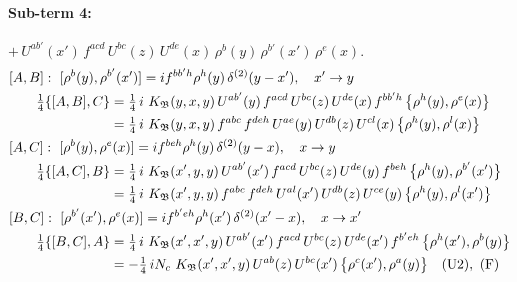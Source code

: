 \documentclass[10pt]{article}
\numberwithin{equation}{section}
\begin{document}
\paragraph{Sub-term 4:} $+\,U^{ab'}(x')\,f^{acd}\,U^{bc}(z)\,U^{de}(x)\,\rho^{b}(y)\,\rho^{b'}(x')\,\rho^{e}(x)$.
\begin{align}
&[A,B]:\ [\rho^{b}(y),\rho^{b'}(x')]=i f^{bb'h}\rho^{h}(y)\,\delta^{(2)}(y-x'),\quad x'\to y\notag\\
&\qquad \tfrac14\{[A,B],C\}=\tfrac14\,i\,\,K_{\mathfrak B}(y,x,y)\,U^{ab'}(y)\,f^{acd}\,U^{bc}(z)\,U^{de}(x)\,f^{bb'h}\,\big\{\rho^{h}(y),\rho^{e}(x)\big\}\notag\\
&\qquad\phantom{\tfrac14\{[A,B],C\}}=\tfrac14\,i\,\,K_{\mathfrak B}(y,x,y)\,f^{abc}\,f^{deh}\,U^{ae}(y)\,U^{db}(z)\,U^{cl}(x)\,\big\{\rho^{h}(y),\rho^{l}(x)\big\}
\label{eq:GIII.II-4-AB}\\
&[A,C]:\ [\rho^{b}(y),\rho^{e}(x)]=i f^{beh}\rho^{h}(y)\,\delta^{(2)}(y-x),\quad x\to y\notag\\
&\qquad \tfrac14\{[A,C],B\}=\tfrac14\,i\,\,K_{\mathfrak B}(x',y,y)\,U^{ab'}(x')\,f^{acd}\,U^{bc}(z)\,U^{de}(y)\,f^{beh}\,\big\{\rho^{h}(y),\rho^{b'}(x')\big\}\notag\\
&\qquad\phantom{\tfrac14\{[A,C],B\}}=\tfrac14\,i\,\,K_{\mathfrak B}(x',y,y)\,f^{abc}\,f^{deh}\,U^{al}(x')\,U^{db}(z)\,U^{ce}(y)\,\big\{\rho^{h}(y),\rho^{l}(x')\big\}
\label{eq:GIII.II-4-AC}\\
&[B,C]:\ [\rho^{b'}(x'),\rho^{e}(x)]=i f^{b'eh}\rho^{h}(x')\,\delta^{(2)}(x'-x),\quad x\to x'\notag\\
&\qquad \tfrac14\{[B,C],A\}=\tfrac14\,i\,\,K_{\mathfrak B}(x',x',y)\,U^{ab'}(x')\,f^{acd}\,U^{bc}(z)\,U^{de}(x')\,f^{b'eh}\,\big\{\rho^{h}(x'),\rho^{b}(y)\big\}\notag\\
&\qquad\phantom{\tfrac14\{[B,C],A\}}=-\tfrac14\,i N_{c}\,\,K_{\mathfrak B}(x',x',y)\,U^{ab}(z)\,U^{bc}(x')\,\big\{\rho^{c}(x'),\rho^{a}(y)\big\}\quad\text{(U2)},\ \text{(F)}
\label{eq:GIII.II-4-BC}
\end{align}
\end{document}
